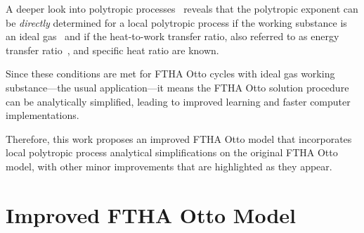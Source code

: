     A deeper look into polytropic processes~\cite{2012-ChristiansJ-IntJMechEngEduc, 2020-NaaktgeborenC-Polytropic-engrXiv-rev02}
    reveals that the polytropic exponent can be \emph{directly} determined  for  a  local  polytropic  process  if  the  working
    substance is an ideal gas~\cite{2020-NaaktgeborenC-Polytropic-engrXiv-rev02} and if the heat-to-work  transfer  ratio,  also
    referred to as energy transfer ratio~\cite{2012-ChristiansJ-IntJMechEngEduc}, and specific heat ratio are known.

    Since these conditions are met for FTHA Otto cycles with ideal gas working substance---the usual application---it means  the
    FTHA  Otto  solution  procedure  can  be  analytically  simplified,  leading  to  improved  learning  and  faster   computer
    implementations.

    Therefore, this  work  proposes  an  improved  FTHA  Otto  model  that  incorporates  local  polytropic  process  analytical
    simplifications on the original FTHA Otto model, with other minor improvements that are highlighted as they appear.



\section{Improved FTHA Otto Model}




